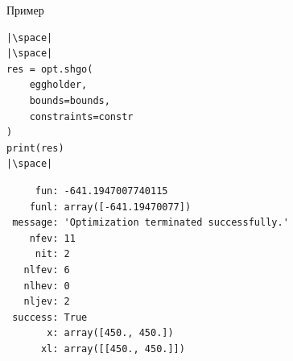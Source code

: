 \documentclass[aspectratio=169, mathserif]{beamer}%
\begin{document}
\begin{frame}[fragile, label=c]{Пример}
\scriptsize
\begin{verbatim}
|\space|
|\space|
res = opt.shgo(
    eggholder,
    bounds=bounds,
    constraints=constr
)
print(res)
|\space|
\end{verbatim}
\vfill
\begin{verbatim}
     fun: -641.1947007740115
    funl: array([-641.19470077])
 message: 'Optimization terminated successfully.'
    nfev: 11
     nit: 2
   nlfev: 6
   nlhev: 0
   nljev: 2
 success: True
       x: array([450., 450.])
      xl: array([[450., 450.]])
\end{verbatim}
\vfill
\end{frame}


\end{document}
